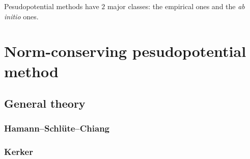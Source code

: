 
Pesudopotential methods have $2$ major classes: the empirical ones
and the \textit{ab initio} ones.

\section{Norm-conserving pesudopotential method}

\subsection{General theory}

\subsubsection{Hamann--Schlüte--Chiang}

\subsubsection{Kerker}


